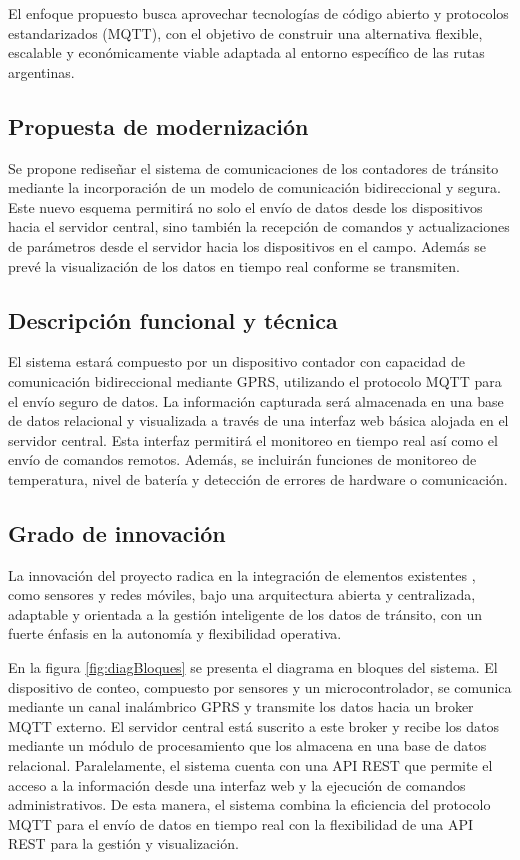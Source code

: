 \documentclass[
11pt, %
]{charter}
\begin{document}
El enfoque propuesto busca aprovechar tecnologías de código abierto y protocolos estandarizados (MQTT), con el objetivo de construir una alternativa flexible, escalable y económicamente viable adaptada al entorno específico de las rutas argentinas.
\subsection{Propuesta de modernización}

Se propone rediseñar el sistema de comunicaciones de los contadores de tránsito mediante la incorporación de un modelo de comunicación bidireccional y segura.
Este nuevo esquema permitirá no solo el envío de datos desde los dispositivos hacia el servidor central, sino también la recepción de comandos y actualizaciones de parámetros desde el servidor hacia los dispositivos en el campo.
Además se prevé la visualización de los datos en tiempo real conforme se transmiten.

\subsection{Descripción funcional y técnica}

El sistema estará compuesto por un dispositivo contador con capacidad de comunicación bidireccional mediante GPRS, utilizando el protocolo MQTT para el envío seguro de datos. La información capturada será almacenada en una base de datos relacional y visualizada a través de una interfaz web básica alojada en el servidor central. Esta interfaz permitirá el monitoreo en tiempo real así como el envío de comandos remotos. Además, se incluirán funciones de monitoreo de temperatura, nivel de batería y detección de errores de hardware o comunicación.




\subsection{Grado de innovación}
La innovación del proyecto radica en la integración de elementos existentes , como sensores y redes móviles, bajo una arquitectura abierta y centralizada, adaptable y orientada a la gestión inteligente de los datos de tránsito, con un fuerte énfasis en la autonomía y flexibilidad operativa.


En la figura \ref{fig:diagBloques} se presenta el diagrama en bloques del sistema. El dispositivo de conteo, compuesto por sensores y un microcontrolador, se comunica mediante un canal inalámbrico GPRS y transmite los datos hacia un broker MQTT externo. El servidor central está suscrito a este broker y recibe los datos mediante un módulo de procesamiento que los almacena en una base de datos relacional. Paralelamente, el sistema cuenta con una API REST que permite el acceso a la información desde una interfaz web y la ejecución de comandos administrativos. De esta manera, el sistema combina la eficiencia del protocolo MQTT para el envío de datos en tiempo real con la flexibilidad de una API REST para la gestión y visualización.
\end{document}
